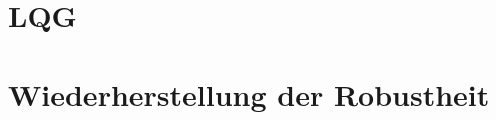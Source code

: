 \begin{multicols*}{3}
\section{LQG}
    
    
    
    
    
\section{Wiederherstellung der Robustheit}
    
    
\end{multicols*}     



